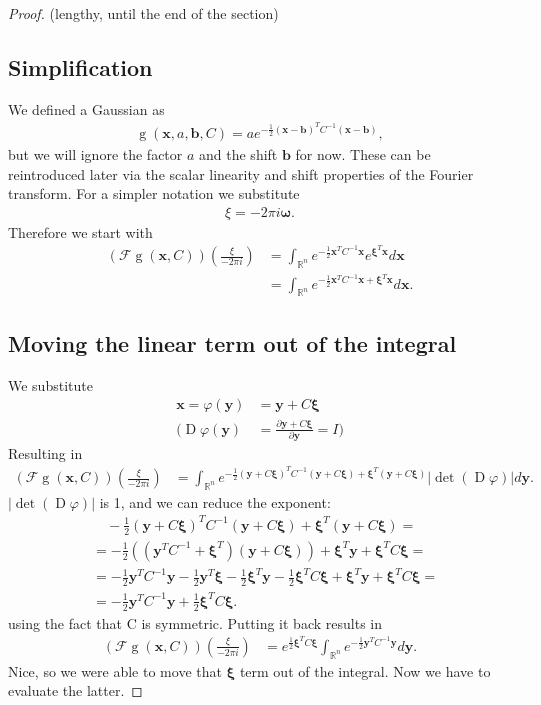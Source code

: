 \documentclass{paper}
\newcommand{\abs}[1]{\left| #1 \right|}
\newcommand{\F}{\ensuremath{\mathcal{F}}}
\newcommand{\vr}[1]{\ensuremath{\boldsymbol{#1}}}
\newcommand{\f}[1]{\operatorname{#1}}
\newcommand{\omegavec}[0]{\ensuremath{\vr{\omega{}}}}
\newcommand{\xivec}[0]{\ensuremath{\vr{\xi{}}}}
\newcommand{\yvec}[0]{\ensuremath{\vr{y}}}
\begin{document}
\begin{proof} (lengthy, until the end of the section)
\subsection*{Simplification}
We defined a Gaussian as 
\begin{align*}
	\f{g}(\vr{x}, a, \vr{b}, C) = a e^{-\frac{1}{2}(\vr{x}-\vr{b})^T C^{-1}(\vr{x}-\vr{b})},
\end{align*}
but we will ignore the factor $a$ and the shift $\vr{b}$ for now.
These can be reintroduced later via the scalar linearity and shift properties of the Fourier transform.
For a simpler notation we substitute
\begin{align*}
	\xi = -2 \pi i \omegavec.
\end{align*}
Therefore we start with
\begin{align*}
	(\F\f{g}(\vr{x}, C))(\frac{\xi}{-2 \pi i}) &= \int_{\mathbb{R}^n} e^{-\frac{1}{2} \vr{x}^T C^{-1} \vr{x}} e^{\vr{\xi}^T \vr{x}} d\vr{x} \\
	&= \int_{\mathbb{R}^n} e^{-\frac{1}{2} \vr{x}^T C^{-1} \vr{x} + \vr{\xi}^T \vr{x}} d\vr{x}.
\end{align*}

\subsection*{Moving the linear term out of the integral}
We substitute
\begin{align*}
	\vr{x} = \varphi(\vr{y}) &= \vr{y} + C\vr{\xi} \\
	\Bigg( \f{D}\varphi(\yvec) &= \frac{\partial \vr{y} + C\vr{\xi}}{\partial \vr{y}} = I \Bigg)
\end{align*}
Resulting in
\begin{align*}
	(\F\f{g}(\vr{x}, C))(\frac{\xi}{-2 \pi i})
	&= \int_{\mathbb{R}^n} e^{-\frac{1}{2} (\yvec + C\xivec)^T C^{-1} (\yvec + C\xivec) + \xivec^T (\yvec + C\xivec)} \abs{\f{det}(\f{D}\varphi)} d\yvec.
\end{align*}
$\abs{\f{det}(\f{D}\varphi)}$ is 1, and we can reduce the exponent:
\begin{align*}
	&\quad -\frac{1}{2} (\yvec + C\xivec)^T C^{-1} (\yvec + C\xivec) + \xivec^T (\yvec + C\xivec) = \\
	&= -\frac{1}{2} \left( (\yvec^T C^{-1} + \xivec^T)(\yvec + C \xivec) \right) + \xivec^T \yvec + \xivec^T C \xivec = \\
	&= -\frac{1}{2} \yvec^T C^{-1} \yvec - \frac{1}{2} \yvec^T \xivec -\frac{1}{2} \xivec^T \yvec -\frac{1}{2} \xivec^T C \xivec + \xivec^T \yvec + \xivec^T C \xivec = \\
	&= -\frac{1}{2} \yvec^T C^{-1} \yvec + \frac{1}{2} \xivec^T C \xivec.
\end{align*}
using the fact that C is symmetric.
Putting it back results in
\begin{align}
	\label{eq:fourier_only_gauss_int_left}
	(\F\f{g}(\vr{x}, C))(\frac{\xi}{-2 \pi i})
	&= e^{\frac{1}{2} \xivec^T C \xivec} \int_{\mathbb{R}^n} e^{-\frac{1}{2} \yvec^T C^{-1} \yvec}  d\yvec.
\end{align}
Nice, so we were able to move that $\xivec$ term out of the integral.
Now we have to evaluate the latter.

\end{proof}
\end{document}
